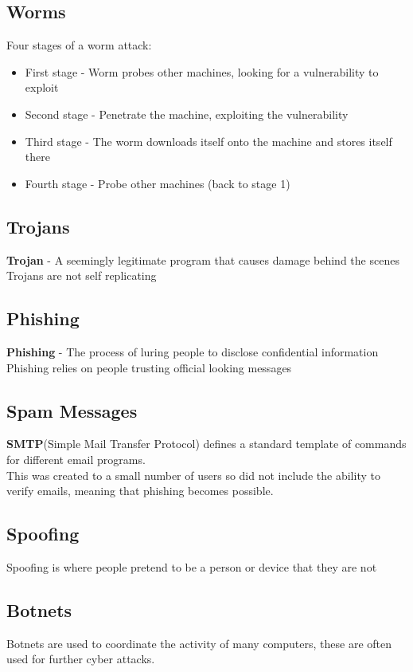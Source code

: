 \documentclass{article}[18pt]
\begin{document}
\subsection{Worms}
Four stages of a worm attack:
\begin{itemize}
\item First stage - Worm probes other machines, looking for a vulnerability to exploit
\item Second stage - Penetrate the machine, exploiting the vulnerability
\item Third stage - The worm downloads itself onto the machine and stores itself there
\item Fourth stage - Probe other machines (back to stage 1)
\end{itemize}
\subsection{Trojans}
\textbf{Trojan} - A seemingly legitimate program that causes damage behind the scenes\\
Trojans are not self replicating
\subsection{Phishing}
\textbf{Phishing} - The process of luring people to disclose confidential information\\
Phishing relies on people trusting official looking messages
\subsection{Spam Messages}
\textbf{SMTP}(Simple Mail Transfer Protocol) defines a standard template of commands for different email programs.\\
This was created to a small number of users so did not include the ability to verify emails, meaning that phishing becomes possible.
\subsection{Spoofing}
Spoofing is where people pretend to be a person or device that they are not
\subsection{Botnets}
Botnets are used to coordinate the activity of many computers, these are often used for further cyber attacks.
\end{document}
